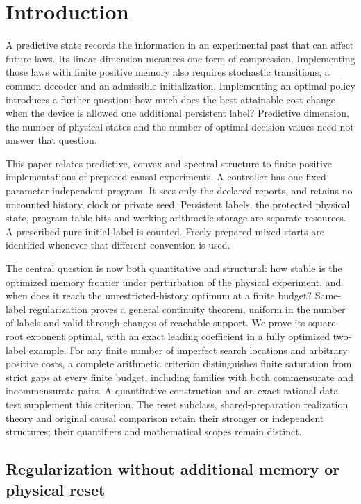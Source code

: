 \section{Introduction}\label{sec:current-overview}\label{sec:introduction}

A predictive state records the information in an experimental past that
can affect future laws.  Its linear dimension measures one form of
compression.  Implementing those laws with finite positive memory also
requires stochastic transitions, a common decoder and an admissible
initialization.  Implementing an optimal policy introduces a further
question: how much does the best attainable cost change when the device
is allowed one additional persistent label?  Predictive dimension,
the number of physical states and the number of optimal decision values
need not answer that question.

This paper relates predictive, convex and spectral structure to finite
positive implementations of prepared causal experiments.  A controller
has one fixed parameter-independent program.  It sees only the declared
reports, and retains no uncounted history, clock or private seed.
Persistent labels, the protected physical state, program-table bits and
working arithmetic storage are separate resources.  A prescribed pure
initial label is counted.  Freely prepared mixed starts are identified
whenever that different convention is used.

The central question is now both quantitative and structural: how
stable is the optimized memory frontier under perturbation of the
physical experiment, and when does it reach the unrestricted-history
optimum at a finite budget?  Same-label regularization proves a general
continuity theorem, uniform in the number of labels and valid through
changes of reachable support.  We prove its square-root exponent
optimal, with an exact leading coefficient in a fully optimized
two-label example.  For any finite number of imperfect search locations and arbitrary
positive costs, a complete arithmetic criterion distinguishes finite
saturation from strict gaps at every finite budget, including families
with both commensurate and incommensurate pairs.  A quantitative
construction and an exact rational-data test supplement this criterion.
The reset subclass, shared-preparation realization theory and original
causal comparison retain their stronger or independent structures;
their quantifiers and mathematical scopes remain distinct.

\subsection*{Regularization without additional memory or physical reset}

